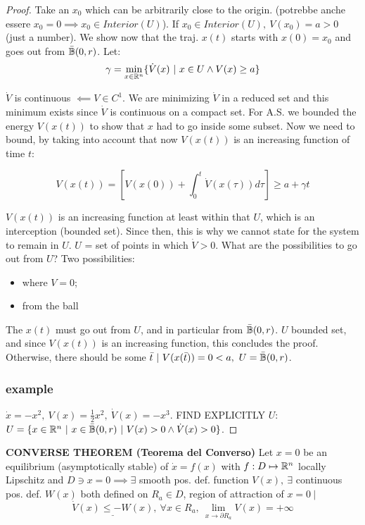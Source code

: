 \begin{proof}
Take an $x_0$ which can be arbitrarily close to the origin. (potrebbe anche essere $x_0=0 \implies x_0 \in Interior(U)$). If $x_0 \in Interior(U),\ V(x_0) = a > 0$ (just a number). We show now that the traj. $x(t)$ starts with $x(0) = x_0$ and goes out from $\bar{\mathbb{B}}(0,r)$. Let:
\[
	\gamma = \min_{x\in\mathbb{R}^n}\{\dot{V}(x)\ |\ x \in U \land V(x) \geq a\}
\]

$\dot{V}$ is continuous $\impliedby V \in C^1$. We are minimizing $\dot{V}$ in a reduced set and this minimum exists since $\dot{V}$ is continuous on a compact set. For A.S. we bounded the energy $V(x(t))$ to show that $x$ had to go inside some subset. Now we need to bound, by taking into account that now $V(x(t))$ is an increasing function of time $t$:

\[
	V(x(t)) = [V(x(0)) + \int_0^t{\dot{V}(x(\tau))d\tau}] \geq a + \gamma t
\]

$V(x(t))$ is an increasing function at least within that $U$, which is an interception (bounded set). Since then, this is why we cannot state for the system to remain in $U$. $U$ = set of points in which $\dot{V}>0$. What are the possibilities to go out from $U$? Two possibilities: \begin{itemize}
\item where $V = 0$;
\item from the ball
\end{itemize}

The $x(t)$ must go out from $U$, and in particular from $\bar{\mathbb{B}}(0,r)$. $U$ bounded set, and since $V(x(t))$ is an increasing function, this concludes the proof. Otherwise, there should be some $\bar{t}\ |\ V(x(\bar{t})) = 0 < a,\ U=\bar{\mathbb{B}}(0,r)$.

\subsubsection{example}

$\dot{x}=-x^2,\ V(x)=\frac{1}{2}x^2,\ \dot{V}(x)=-x^3$. FIND EXPLICITLY $U$: $U = \{x \in \R^n\ |\ x \in \cball(0,r)\ |\ V(x) > 0 \land \dot{V}(x) > 0\}$.

\end{proof}

\begin{thrm}{\textbf{CONVERSE THEOREM (Teorema del Converso)}} \newline
Let $x=0$ be an equilibrium (asymptotically stable) of $\dot{x}=f(x)$ with $f:D\mapsto \mathbb{R}^n$ locally Lipschitz and $D \ni x=0 \implies \exists$ smooth pos. def. function $V(x),\ \exists$ continuous pos. def. $W(x)$ both defined on $R_a \in D$, region of attraction of $x=0\ |$
\[
	\underline{\dot{V}(x) \leq -W(x)},\ \forall x \in R_a,\ \lim_{x\to\partial{R_a}}{V(x)} = +\infty
\]
\end{thrm}


